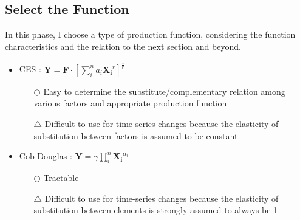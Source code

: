 \documentclass[aspectratio=169, dvipdfmx, 11pt]{beamer}
\begin{document}
\subsection{Select the Function}
\begin{frame}
    In this phase, I choose a type of production function, considering the function characteristics and the relation to the next section and beyond.
    \begin{itemize}
        \setlength{\itemsep}{7mm}
        \item CES : $\bm{Y}=\bm{F}\cdot\left[\sum\limits_{i}^n {a_i}{{\bm{X_{i}}}^{r}}\right]^{\frac{1}{r}}$
              \begin{itemize}
                  \setlength{\itemsep}{.1in}
                  \item[$\bigcirc$] {\color{blue} Easy to determine the substitute/complementary relation among various factors and appropriate production function}
                  \item[$\bigtriangleup$] {\color{red} Difficult to use for time-series changes because the elasticity of substitution between factors is assumed to be constant}
              \end{itemize}
        \item Cob-Douglas : $\bm{Y}=\gamma\prod\limits_{i}^{n} \bm{X_{i}}^{\alpha_{i}}$
              \begin{itemize}
                  \setlength{\itemsep}{.1in}
                  \item[$\bigcirc$] {\color{blue} Tractable}
                  \item[$\bigtriangleup$] {\color{red} Difficult to use for time-series changes because the elasticity of substitution between elements is strongly assumed to always be 1}
              \end{itemize}
    \end{itemize}
\end{frame}
\end{document}
